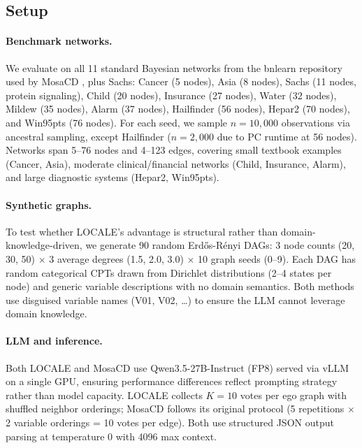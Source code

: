 \documentclass{article}
\begin{document}
\subsection{Setup}

\paragraph{Benchmark networks.} We evaluate on all 11 standard Bayesian networks from the bnlearn repository used by MosaCD \citep{chen2024mosacd}, plus Sachs: Cancer (5 nodes), Asia (8 nodes), Sachs (11 nodes, protein signaling), Child (20 nodes), Insurance (27 nodes), Water (32 nodes), Mildew (35 nodes), Alarm (37 nodes), Hailfinder (56 nodes), Hepar2 (70 nodes), and Win95pts (76 nodes). For each seed, we sample $n{=}10{,}000$ observations via ancestral sampling, except Hailfinder ($n{=}2{,}000$ due to PC runtime at 56 nodes). Networks span 5--76 nodes and 4--123 edges, covering small textbook examples (Cancer, Asia), moderate clinical/financial networks (Child, Insurance, Alarm), and large diagnostic systems (Hepar2, Win95pts).

\paragraph{Synthetic graphs.} To test whether LOCALE's advantage is structural rather than domain-knowledge-driven, we generate 90 random Erd\H{o}s-R\'{e}nyi DAGs: 3 node counts (20, 30, 50) $\times$ 3 average degrees (1.5, 2.0, 3.0) $\times$ 10 graph seeds (0--9). Each DAG has random categorical CPTs drawn from Dirichlet distributions (2--4 states per node) and generic variable descriptions with no domain semantics. Both methods use disguised variable names (V01, V02, \ldots) to ensure the LLM cannot leverage domain knowledge.

\paragraph{LLM and inference.} Both LOCALE and MosaCD use Qwen3.5-27B-Instruct (FP8) served via vLLM on a single GPU, ensuring performance differences reflect prompting strategy rather than model capacity. LOCALE collects $K{=}10$ votes per ego graph with shuffled neighbor orderings; MosaCD follows its original protocol (5 repetitions $\times$ 2 variable orderings = 10 votes per edge). Both use structured JSON output parsing at temperature 0 with 4096 max context.
\end{document}
